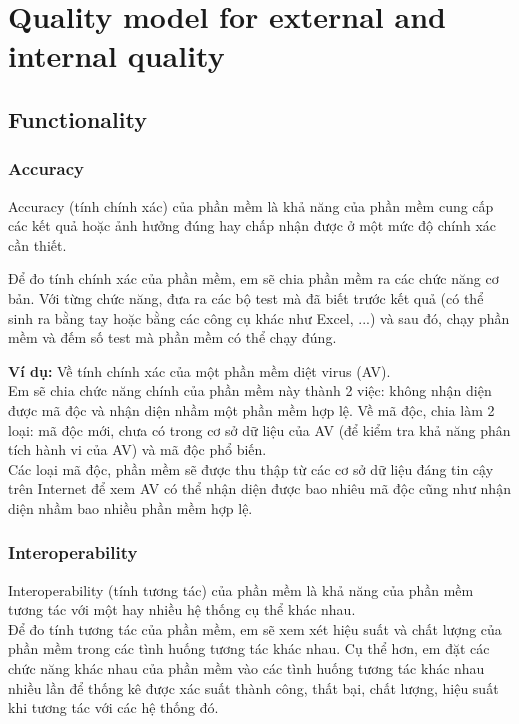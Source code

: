 \documentclass[14pt]{extarticle}
\begin{document}
\newpage
\tableofcontents
\newpage

\setcounter{section}{5}
\section{Quality model for external and internal quality}

\subsection{Functionality}

\setcounter{subsubsection}{1}
\subsubsection{Accuracy}

Accuracy (tính chính xác) của phần mềm là khả năng của phần mềm cung cấp
các kết quả hoặc ảnh hưởng đúng hay chấp nhận được ở một mức độ
chính xác cần thiết.

Để đo tính chính xác của phần mềm, em sẽ chia phần mềm ra các
chức năng cơ bản. Với từng chức năng, đưa ra các bộ test mà
đã biết trước kết quả (có thể sinh ra bằng tay hoặc bằng các công
cụ khác như Excel, ...) và sau đó, chạy phần mềm và đếm số
test mà phần mềm có thể chạy đúng.

\textbf{Ví dụ:} Về tính chính xác của một phần mềm diệt virus (AV).\\
Em sẽ chia chức năng chính của phần mềm này thành 2 việc:
không nhận diện được mã độc và nhận diện nhầm một phần mềm hợp lệ.
Về mã độc, chia làm 2 loại: mã độc mới, chưa có trong cơ sở dữ liệu
của AV (để kiểm tra khả năng phân tích hành vi của AV) và mã độc
phổ biến.\\
Các loại mã độc, phần mềm sẽ được thu thập từ các cơ sở dữ liệu đáng tin cậy
trên Internet để xem AV có thể nhận diện được bao nhiêu mã độc cũng như
nhận diện nhầm bao nhiều phần mềm hợp lệ.

\subsubsection{Interoperability}
Interoperability (tính tương tác) của phần mềm là khả năng của phần mềm
tương tác với một hay nhiều hệ thống cụ thể khác nhau.\\
Để đo tính tương tác của phần mềm, em sẽ xem xét hiệu suất và chất lượng
của phần mềm trong các tình huống tương tác khác nhau. Cụ thể hơn, em đặt
các chức năng khác nhau của phần mềm vào các tình huống tương tác khác nhau
nhiều lần để thống kê được xác suất thành công, thất bại, chất lượng, hiệu suất
khi tương tác với các hệ thống đó.
\end{document}

